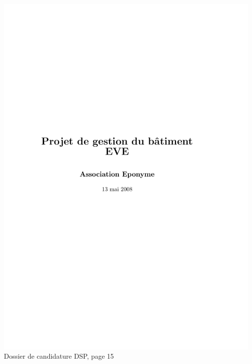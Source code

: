 \includegraphics[scale=0.85,trim=20mm 20mm 20mm 20mm,clip,page=15]{annexes/candidature_dsp.pdf} \\
Dossier de candidature DSP, page 15
\newpage
